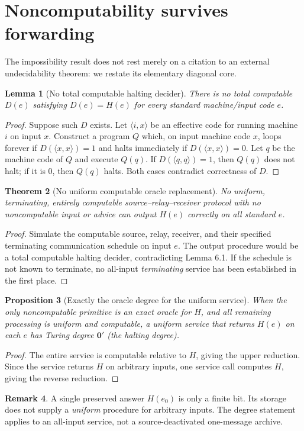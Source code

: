 \documentclass[11pt,letterpaper]{article}
\newtheorem{theorem}{Theorem}[section]\newtheorem{lemma}[theorem]{Lemma}\newtheorem{proposition}[theorem]{Proposition}\newtheorem{corollary}[theorem]{Corollary}\theoremstyle{definition}\newtheorem{definition}[theorem]{Definition}\newtheorem{example}[theorem]{Example}\newtheorem{remark}[theorem]{Remark}\newtheorem{conjecture}[theorem]{Conjecture}
\begin{document}
\section{Noncomputability survives forwarding}
The impossibility result does not rest merely on a citation to an external undecidability theorem: we restate its elementary diagonal core.
\begin{lemma}[No total computable halting decider]
There is no total computable $D(e)$ satisfying $D(e)=H(e)$ for every standard machine/input code $e$.
\end{lemma}
\begin{proof}
Suppose such $D$ exists. Let $\langle i,x\rangle$ be an effective code for running machine $i$ on input $x$. Construct a program $Q$ which, on input machine code $x$, loops forever if $D(\langle x,x\rangle)=1$ and halts immediately if $D(\langle x,x\rangle)=0$. Let $q$ be the machine code of $Q$ and execute $Q(q)$. If $D(\langle q,q\rangle)=1$, then $Q(q)$ does not halt; if it is $0$, then $Q(q)$ halts. Both cases contradict correctness of $D$.
\end{proof}
\begin{theorem}[No uniform computable oracle replacement]
No uniform, terminating, entirely computable source--relay--receiver protocol with no noncomputable input or advice can output $H(e)$ correctly on all standard $e$.
\end{theorem}
\begin{proof}
Simulate the computable source, relay, receiver, and their specified terminating communication schedule on input $e$. The output procedure would be a total computable halting decider, contradicting Lemma 6.1. If the schedule is not known to terminate, no all-input \emph{terminating} service has been established in the first place.
\end{proof}
\begin{proposition}[Exactly the oracle degree for the uniform service]
When the only noncomputable primitive is an exact oracle for $H$, and all remaining processing is uniform and computable, a uniform service that returns $H(e)$ on each $e$ has Turing degree $\mathbf 0'$ (the halting degree).
\end{proposition}
\begin{proof}
The entire service is computable relative to $H$, giving the upper reduction. Since the service returns $H$ on arbitrary inputs, one service call computes $H$, giving the reverse reduction.
\end{proof}
\begin{remark}
A single preserved answer $H(e_0)$ is only a finite bit. Its storage does not supply a \emph{uniform} procedure for arbitrary inputs. The degree statement applies to an all-input service, not a source-deactivated one-message archive.
\end{remark}
\end{document}
